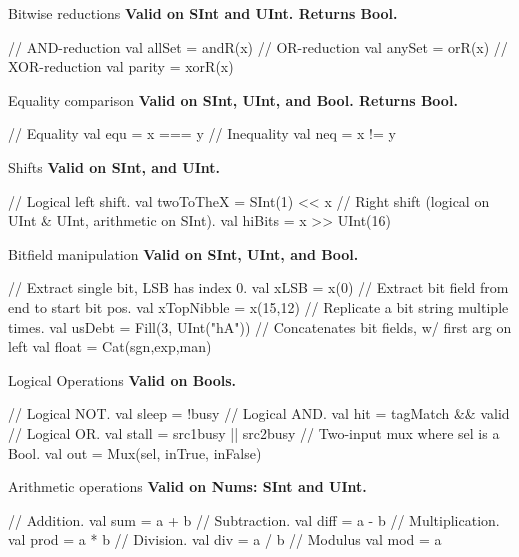 \documentclass[xcolor=pdflatex,dvipsnames,table]{beamer}
\begin{document}
\begin{frame}[fragile]{Bitwise reductions}
\textbf{Valid on SInt and UInt.  Returns Bool.}
\begin{scala}
// AND-reduction 
val allSet = andR(x)  
// OR-reduction
val anySet = orR(x)   
// XOR-reduction 
val parity = xorR(x)  
\end{scala}
\end{frame}

\begin{frame}[fragile]{Equality comparison}
\textbf{Valid on SInt, UInt, and Bool. Returns Bool.}
\begin{scala}
// Equality
val equ = x === y 
// Inequality 
val neq = x != y   
\end{scala}
\end{frame}

\begin{frame}[fragile]{Shifts}
\textbf{Valid on SInt, and UInt.}
\begin{scala}
// Logical left shift.
val twoToTheX = SInt(1) << x   
// Right shift (logical on UInt & UInt, arithmetic on SInt).
val hiBits    = x >> UInt(16) 
\end{scala}
\end{frame}

\begin{frame}[fragile]{Bitfield manipulation}
\textbf{Valid on SInt, UInt, and Bool.}
\begin{scala}
// Extract single bit, LSB has index 0.
val xLSB       = x(0)                
// Extract bit field  from end to start bit pos. 
val xTopNibble = x(15,12)            
// Replicate a bit string multiple times.
val usDebt     = Fill(3, UInt("hA")) 
// Concatenates bit fields, w/ first arg on left
val float      = Cat(sgn,exp,man)    
\end{scala}
\end{frame}

\begin{frame}[fragile]{Logical Operations}
\textbf{Valid on Bools. }
\begin{scala}
// Logical NOT. 
val sleep = !busy                     
// Logical AND.
val hit   = tagMatch && valid         
// Logical OR.
val stall = src1busy || src2busy      
// Two-input mux where sel is a Bool.  
val out   = Mux(sel, inTrue, inFalse) 
\end{scala}
\end{frame}

\begin{frame}[fragile]{Arithmetic operations}
\textbf{Valid on Nums: SInt and UInt. }
\begin{scala}
// Addition. 
val sum  = a + b  
// Subtraction.
val diff = a - b  
// Multiplication. 
val prod = a * b  
// Division.
val div  = a / b  
// Modulus
val mod  = a %
\end{scala}
\end{frame}
\end{document}
